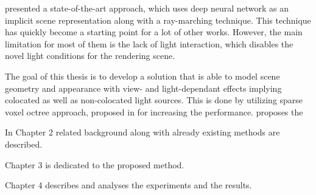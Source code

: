 \cite{mildenhall2020nerf} presented a state-of-the-art approach,
which uses deep neural network as an implicit scene representation
along with a ray-marching technique. 
This technique has quickly become a starting point for a lot of other works. 
However, the main limitation for most of them is the lack of light interaction,
which disables the novel light conditions for the rendering scene.

The goal of this thesis is to develop a solution
that is able to model scene geometry and appearance
with view- and light-dependant effects
implying colocated as well as non-colocated light sources.
This is done by utilizing sparse voxel octree approach,
proposed in \cite{liu2021neural} for increasing the performance.
\cite{bi2020neural} proposes the




In Chapter 2 related background along with already existing methods are described.

Chapter 3 is dedicated to the proposed method.

Chapter 4 describes and analyses the experiments and the results.








